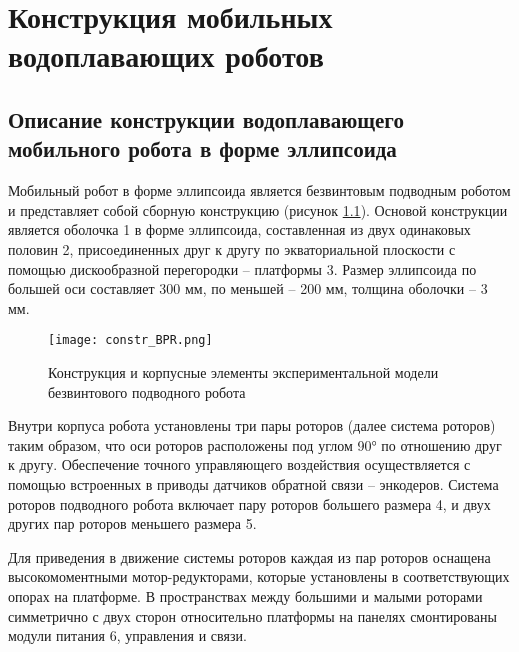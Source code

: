 \chapter{Конструкция мобильных водоплавающих роботов}\label{ch:ch3}

\section{Описание конструкции водоплавающего мобильного робота в форме эллипсоида}\label{sec:ch3/sec1}

Мобильный робот в форме эллипсоида является безвинтовым подводным роботом и представляет собой сборную конструкцию (рисунок \ref{constr_BPR}). Основой конструкции является оболочка 1 в форме эллипсоида, составленная из двух одинаковых половин 2, присоединенных друг к другу по экваториальной плоскости с помощью дискообразной перегородки – платформы 3. Размер эллипсоида по большей оси составляет 300 мм, по меньшей – 200 мм, толщина оболочки -- 3 мм.

\begin{figure}[h]
	\centering
	\texttt{[image: constr\_BPR.png]}%
	\caption{Конструкция и корпусные элементы экспериментальной модели безвинтового подводного робота}
	\label{constr_BPR}
\end{figure}

Внутри корпуса робота установлены три пары роторов (далее система роторов) таким образом, что оси роторов расположены под углом 90° по отношению друг к другу. Обеспечение точного управляющего воздействия осуществляется с помощью встроенных в приводы датчиков обратной связи  -- энкодеров. Система роторов подводного робота включает пару роторов большего размера 4, и двух других пар роторов меньшего размера 5. 

Для приведения в движение системы роторов каждая из пар роторов оснащена высокомоментными мотор-редукторами, которые установлены в соответствующих опорах на платформе. В пространствах между большими и малыми роторами симметрично с двух сторон относительно платформы на панелях смонтированы модули питания 6, управления и связи. 

